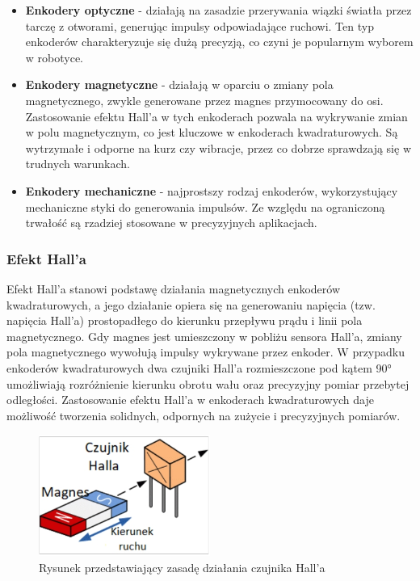 \begin{itemize}
    \item \textbf{Enkodery optyczne} - działają na zasadzie przerywania wiązki światła przez tarczę z otworami, generując impulsy odpowiadające ruchowi. Ten typ enkoderów charakteryzuje się dużą precyzją, co czyni je popularnym wyborem w robotyce.
    \item \textbf{Enkodery magnetyczne} - działają w oparciu o zmiany pola magnetycznego, zwykle generowane przez magnes przymocowany do osi. Zastosowanie efektu Hall'a w tych enkoderach pozwala na wykrywanie zmian w polu magnetycznym, co jest kluczowe w enkoderach kwadraturowych. Są wytrzymałe i odporne na kurz czy wibracje, przez co dobrze sprawdzają się w trudnych warunkach.
    \item \textbf{Enkodery mechaniczne} - najprostszy rodzaj enkoderów, wykorzystujący mechaniczne styki do generowania impulsów. Ze względu na ograniczoną trwałość są rzadziej stosowane w precyzyjnych aplikacjach.
\end{itemize}


\subsubsection{Efekt Hall'a}

Efekt Hall'a stanowi podstawę działania magnetycznych enkoderów kwadraturowych, a jego działanie opiera się na generowaniu napięcia (tzw. napięcia Hall'a) prostopadłego do kierunku przepływu prądu i linii pola magnetycznego. Gdy magnes jest umieszczony w pobliżu sensora Hall'a, zmiany pola magnetycznego wywołują impulsy wykrywane przez enkoder. W przypadku enkoderów kwadraturowych dwa czujniki Hall'a rozmieszczone pod kątem 90° umożliwiają rozróżnienie kierunku obrotu wału oraz precyzyjny pomiar przebytej odległości. Zastosowanie efektu Hall'a w enkoderach kwadraturowych daje możliwość tworzenia solidnych, odpornych na zużycie i precyzyjnych pomiarów.


\begin{figure}[h]
    \centering
    \includegraphics[width=0.5\textwidth]{./graf/halla-enc.jpg}
    \caption{Rysunek przedstawiający zasadę działania czujnika Hall'a \cite{bib:hall_net}}
    \label{rys2:encoders-graf}
\end{figure}


